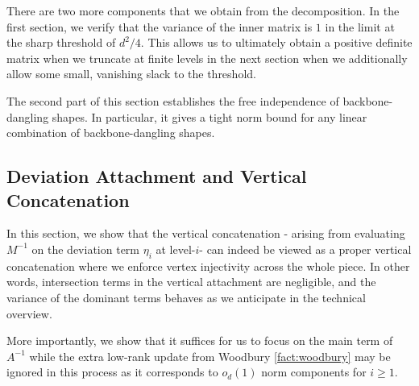 \documentclass[12pt]{article}
\newcommand{\gam}{\gamma}
\newcommand{\corr}{\mathsf{correct}}
\newcommand{\todo}[1]{\textcolor{red}{(#1)}}
\newcommand{\Authornote}[3]{{\sf\footnotesize\color{#3}{[#1: #2]}}}
\newcommand{\Authornote}[3]{}
\newcommand{\jnote}[1]{\Authornote{Jeff}{#1}{blue}}
\newcommand{\snote}[1]{\Authornote{Sofia}{#1}{orange}}
\begin{document}
 There are two more components that we obtain from the decomposition. In the first section, we verify that the variance of the inner matrix is $1$ in the limit at the sharp threshold of $d^2/4$. This allows us to ultimately obtain a positive definite %
 matrix when we truncate at finite levels in the next section when we additionally allow some small, vanishing slack to the threshold.

The second part of this section establishes the free independence of backbone-dangling shapes. In particular, it gives a tight norm bound for any linear combination of backbone-dangling shapes.

%



\subsection{Deviation Attachment and Vertical Concatenation}
In this section, we show that the vertical concatenation - arising from evaluating $M^{-1}$ on the deviation term $\eta_i$ at level-$i$- can indeed be viewed as a proper vertical concatenation where we enforce vertex injectivity across the whole piece. In other words, intersection terms in the vertical attachment are negligible, and the variance of the dominant terms behaves as we anticipate in the technical overview.

 More importantly, we show that it suffices for us to focus on the main term of $A^{-1}$ while the extra low-rank update from Woodbury \cref{fact:woodbury} may be ignored in this process as it corresponds to $o_d(1)$ norm components for $i\geq 1$. 
 
\end{document}

